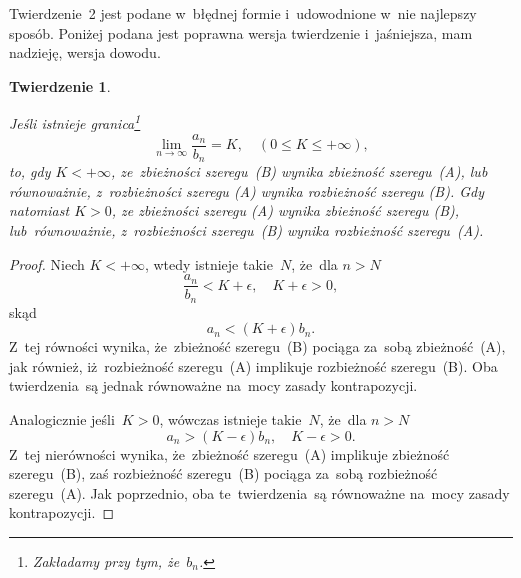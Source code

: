 \documentclass[a4paper,11pt]{article}
\numberwithin{equation}{section}
\newtheorem{theorem}{Twierdzenie}
\begin{document}
\VerSpaceFour





\noindent
{} Twierdzenie~2 jest podane w~błędnej formie
i~udowodnione w~nie najlepszy sposób. Poniżej podana jest poprawna
wersja twierdzenie i~jaśniejsza, mam nadzieję, wersja dowodu.





\begin{theorem}
  \label{thm:Fichtenholz-VolII-02}

  Jeśli istnieje granica\footnote{Zakładamy przy tym, że~$b_{ n }$.}
  \begin{equation}
    \label{eq:FichtenholzVolII-12}
    \lim\limits_{ n \to \infty } \frac{ a_{ n } }{ b_{ n } } = K, \quad
    ( 0 \leq K \leq +\infty ),
  \end{equation}
  to, gdy $K < +\infty$, ze~zbieżności szeregu~(B) wynika zbieżność
  szeregu~(A), lub równoważnie, z~rozbieżności szeregu (A) wynika
  rozbieżność szeregu (B). Gdy natomiast $K > 0$, ze zbieżności
  szeregu (A) wynika zbieżność szeregu (B), lub~równoważnie,
  z~rozbieżności szeregu~(B) wynika rozbieżność szeregu~(A).

\end{theorem}



\begin{proof}
  Niech $K < +\infty$, wtedy istnieje takie~$N$, że~dla $n > N$
  \begin{equation}
    \label{eq:FichtenholzVolII-13}
    \frac{ a_{ n } }{ b_{ n } } < K + \epsilon, \quad
    K + \epsilon > 0,
  \end{equation}
  skąd
  \begin{equation}
    \label{eq:FichtenholzVolII-14}
    a_{ n } < ( K + \epsilon ) b_{ n }.
  \end{equation}
  Z~tej równości wynika, że~zbieżność szeregu~(B) pociąga za~sobą
  zbieżność~(A), jak również, iż~rozbieżność szeregu~(A) implikuje
  rozbieżność szeregu~(B). Oba twierdzenia~są jednak równoważne
  na~mocy zasady kontrapozycji.

  Analogicznie jeśli~$K > 0$, wówczas istnieje takie~$N$, że~dla
  $n > N$
  \begin{equation}
    \label{eq:FichtenholzVolII-15}
    a_{ n } > ( K - \epsilon ) b_{ n }, \quad
    K - \epsilon > 0.
  \end{equation}
  Z~tej nierówności wynika, że~zbieżność szeregu~(A) implikuje
  zbieżność szeregu~(B), zaś rozbieżność szeregu~(B) pociąga za~sobą
  rozbieżność szeregu~(A). Jak poprzednio, oba te~twierdzenia~są
  równoważne na~mocy zasady kontrapozycji.

\end{proof}
\end{document}

